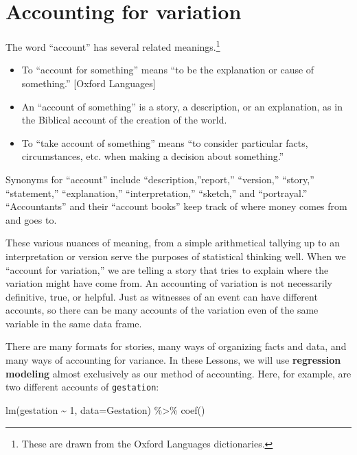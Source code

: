 \documentclass[
  letterpaper,
  DIV=11,
  numbers=noendperiod,
  oneside]{scrreprt}
\newenvironment{Shaded}{\begin{snugshade}}{\end{snugshade}}
\newcommand{\AttributeTok}[1]{\textcolor[rgb]{0.40,0.45,0.13}{#1}}
\newcommand{\DecValTok}[1]{\textcolor[rgb]{0.68,0.00,0.00}{#1}}
\newcommand{\FunctionTok}[1]{\textcolor[rgb]{0.28,0.35,0.67}{#1}}
\newcommand{\NormalTok}[1]{\textcolor[rgb]{0.00,0.23,0.31}{#1}}
\newcommand{\SpecialCharTok}[1]{\textcolor[rgb]{0.37,0.37,0.37}{#1}}
\providecommand{\tightlist}{%
  \setlength{\itemsep}{0pt}\setlength{\parskip}{0pt}}\usepackage{longtable,booktabs,array}
\begin{document}
\hypertarget{sec-accounting-for-variation}{%
\section{Accounting for variation}\label{sec-accounting-for-variation}}

The word ``account'' has several related meanings.\footnote{These are
  drawn from the Oxford Languages dictionaries.}

\begin{itemize}
\tightlist
\item
  To ``account for something'' means ``to be the explanation or cause of
  something.'' {[}Oxford Languages{]}
\item
  An ``account of something'' is a story, a description, or an
  explanation, as in the Biblical account of the creation of the world.
\item
  To ``take account of something'' means ``to consider particular facts,
  circumstances, etc. when making a decision about something.''
\end{itemize}

Synonyms for ``account'' include ``description,''report,'' ``version,''
``story,'' ``statement,'' ``explanation,'' ``interpretation,''
``sketch,'' and ``portrayal.'' ``Accountants'' and their ``account
books'' keep track of where money comes from and goes to.

These various nuances of meaning, from a simple arithmetical tallying up
to an interpretation or version serve the purposes of statistical
thinking well. When we ``account for variation,'' we are telling a story
that tries to explain where the variation might have come from. An
accounting of variation is not necessarily definitive, true, or helpful.
Just as witnesses of an event can have different accounts, so there can
be many accounts of the variation even of the same variable in the same
data frame.

There are many formats for stories, many ways of organizing facts and
data, and many ways of accounting for variance. In these Lessons, we
will use \textbf{regression modeling} almost exclusively as our method
of accounting. Here, for example, are two different accounts of
\texttt{gestation}:

\begin{Shaded}
\begin{Highlighting}[]
\FunctionTok{lm}\NormalTok{(gestation }\SpecialCharTok{\textasciitilde{}} \DecValTok{1}\NormalTok{, }\AttributeTok{data=}\NormalTok{Gestation) }\SpecialCharTok{\%\textgreater{}\%} \FunctionTok{coef}\NormalTok{()}
\end{Highlighting}
\end{Shaded}
\end{document}
